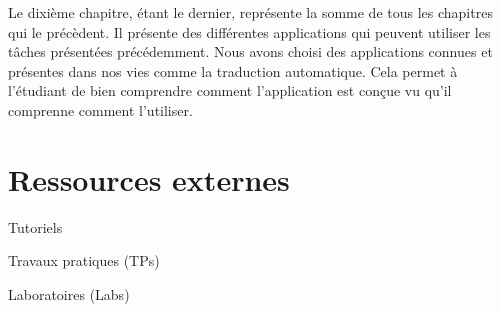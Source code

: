 \documentclass{KodeBook}
\begin{document}
Le dixième chapitre, étant le dernier, représente la somme de tous les chapitres qui le précèdent.
Il présente des différentes applications qui peuvent utiliser les tâches présentées précédemment.
Nous avons choisi des applications connues et présentes dans nos vies comme la traduction automatique.
Cela permet à l'étudiant de bien comprendre comment l'application est conçue vu qu'il comprenne comment l'utiliser.


\section*{Ressources externes}

Tutoriels 

Travaux pratiques (TPs)

Laboratoires (Labs)

\ifx\wholebook\relax\else
% 
% 
	
\end{document}
